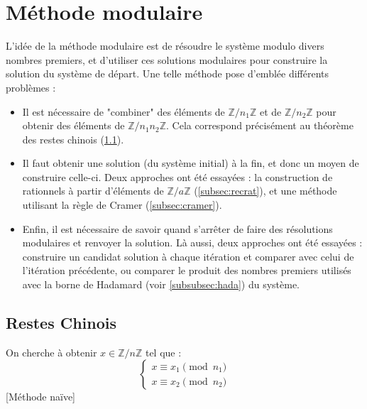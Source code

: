 \documentclass[french]{article}
\begin{document}
\section{Méthode modulaire} \label{sec:modulaire}
L'idée de la méthode modulaire est de résoudre le système modulo divers nombres premiers, et d'utiliser ces solutions modulaires pour construire la solution du système de départ. Une telle méthode pose d'emblée différents problèmes :
\begin{itemize}
	\item Il est nécessaire de "combiner" des éléments de $\mathbb{Z}/n_1\mathbb{Z}$ et de $\mathbb{Z}/n_2\mathbb{Z}$ pour obtenir des éléments de $\mathbb{Z}/n_1n_2\mathbb{Z}$. Cela correspond précisément au théorème des restes chinois (\ref{subsec:chin}).
	\item Il faut obtenir une solution (du système initial) à la fin, et donc un moyen de construire celle-ci. Deux approches ont été essayées : la construction de rationnels à partir d'éléments de $\mathbb{Z}/a\mathbb{Z}$ (\ref{subsec:recrat}), et une méthode utilisant la règle de Cramer (\ref{subsec:cramer}).
	\item Enfin, il est nécessaire de savoir quand s'arrêter de faire des résolutions modulaires et renvoyer la solution. Là aussi, deux approches ont été essayées : construire un candidat solution à chaque itération et comparer avec celui de l'itération précédente, ou comparer le produit des nombres premiers utilisés avec la borne de Hadamard (voir \ref{subsubsec:hada}) du système.
\end{itemize}
\subsection{Restes Chinois} \label{subsec:chin}
On cherche à obtenir $x \in \mathbb{Z}/n\mathbb{Z}$ tel que :
\begin{equation*}
	\begin{cases}
		x \equiv x_1 \pmod n_1\\
		x \equiv x_2 \pmod n_2
	\end{cases}
\end{equation*}
[Méthode naïve]
\end{document}
